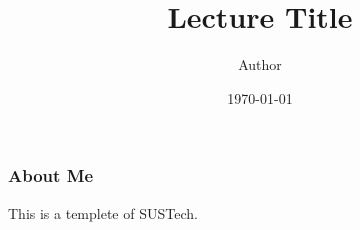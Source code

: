 \documentclass{beamer}
\title{Lecture Title}
\author{Author}
\date{\today}
\begin{document}
\begin{frame}
    \titlepage
\end{frame}

\begin{frame}
    \frametitle{About Me}
    This is a templete of SUSTech.
\end{frame}
\end{document}
